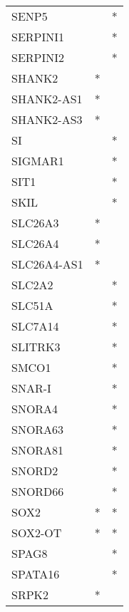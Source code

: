 \begin{longtable}{lcc}
SENP5            &                &          * \\
SERPINI1         &                &          * \\
SERPINI2         &                &          * \\
SHANK2           &              * &            \\
SHANK2-AS1       &              * &            \\
SHANK2-AS3       &              * &            \\
SI               &                &          * \\
SIGMAR1          &                &          * \\
SIT1             &                &          * \\
SKIL             &                &          * \\
SLC26A3          &              * &            \\
SLC26A4          &              * &            \\
SLC26A4-AS1      &              * &            \\
SLC2A2           &                &          * \\
SLC51A           &                &          * \\
SLC7A14          &                &          * \\
SLITRK3          &                &          * \\
SMCO1            &                &          * \\
SNAR-I           &                &          * \\
SNORA4           &                &          * \\
SNORA63          &                &          * \\
SNORA81          &                &          * \\
SNORD2           &                &          * \\
SNORD66          &                &          * \\
SOX2             &              * &          * \\
SOX2-OT          &              * &          * \\
SPAG8            &                &          * \\
SPATA16          &                &          * \\
SRPK2            &              * &            \\

\end{longtable}
